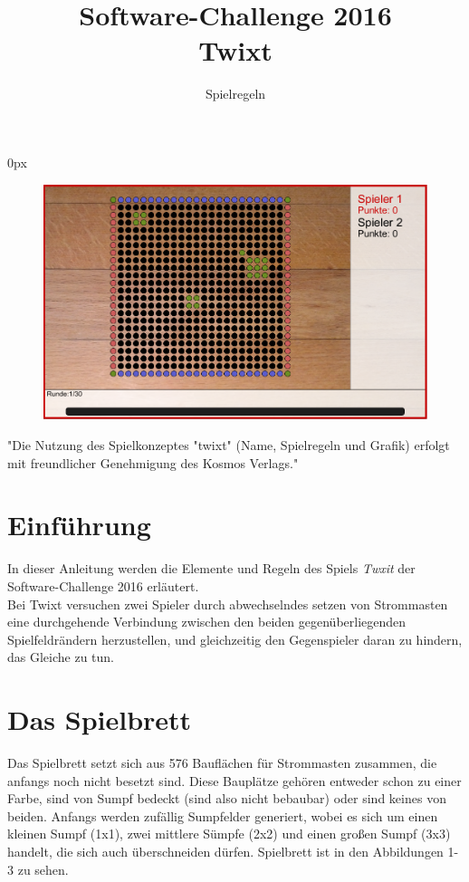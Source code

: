 \documentclass[a4paper, ngerman]{scrartcl}
\title{Software-Challenge 2016 \\ Twixt}
\subtitle{Spielregeln}
\begin{document}
 
\parindent0px
\maketitle

\begin{figure}[h!]
	\centering
	\includegraphics[width=\linewidth]{bilder/gui.png} 
\end{figure}
\vspace*{\fill}
"Die Nutzung des Spielkonzeptes "twixt" (Name, Spielregeln
und Grafik) erfolgt mit freundlicher Genehmigung des Kosmos Verlags."
\newpage
\tableofcontents
\newpage

\section{Einführung}
In dieser Anleitung werden die Elemente und Regeln des Spiels \emph{Twxit} der
Software-Challenge 2016 erläutert.\\
Bei Twixt versuchen zwei Spieler durch abwechselndes setzen von Strommasten eine
durchgehende Verbindung zwischen den beiden gegenüberliegenden Spielfeldrändern
herzustellen, und gleichzeitig den Gegenspieler daran zu hindern, das Gleiche zu
tun. 

\section{Das Spielbrett}
Das Spielbrett setzt sich aus 576 Bauflächen für Strommasten zusammen, die
anfangs noch nicht besetzt sind.
Diese Bauplätze gehören entweder schon zu einer Farbe, sind von Sumpf bedeckt
(sind also nicht bebaubar) oder sind keines von beiden.
Anfangs werden zufällig Sumpfelder generiert, wobei es sich um einen kleinen
Sumpf (1x1), zwei mittlere Sümpfe (2x2) und einen großen Sumpf (3x3) handelt,
die sich auch überschneiden dürfen. Spielbrett ist in den Abbildungen 1-3 zu
sehen.
\end{document}
